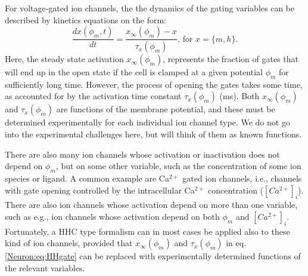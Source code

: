 For voltage-gated ion channels, the the dynamics of the gating variables can be described by kinetics equations on the form:
\begin{equation}
\frac{dx(\phi_m,t)}{dt} = \frac{x_{\infty}(\phi_m) - x}{\tau_x(\phi_m)},  \, \text{for } x = \{m,h\}.
\label{Neuron:eq:HHgate}
\end{equation}
Here, the steady state activation $x_{\infty}(\phi_m)$, represents the fraction of gates that will end up in the open state if the cell is clamped at a given potential $\phi_m$ for sufficiently long time. However, the process of opening the gates takes some time, as accounted for by the activation time constant $\tau_x(\phi_m)$ (ms). Both $x_{\infty}(\phi_m)$ and $\tau_x(\phi_m)$ are functions of the membrane potential, and these must be determined experimentally for each individual ion channel type. We do not go into the experimental challenges here, but will think of them as known functions. 

There are also many ion channels whose activation or inactivation does not depend on $\phi_m$, but on some other variable, such as the concentration of some ion species or ligand. A common example are Ca$^{2+}$ gated ion channels, i.e., channels with gate opening controlled by the intracellular Ca$^{2+}$ concentration ($[Ca^{2+}]_i$). There are also ion channels whose activation depend on more than one variable, such as e.g., ion channels whose activation depend on both $\phi_m$ and $[Ca^{2+}]_i$. Fortunately, a HHC type formalism can in most cases be applied also to these kind of ion channels, provided that $x_{\infty}(\phi_m)$ and $\tau_x(\phi_m)$ in eq. \ref{Neuron:eq:HHgate} can be replaced with experimentally determined functions of the relevant variables. 


